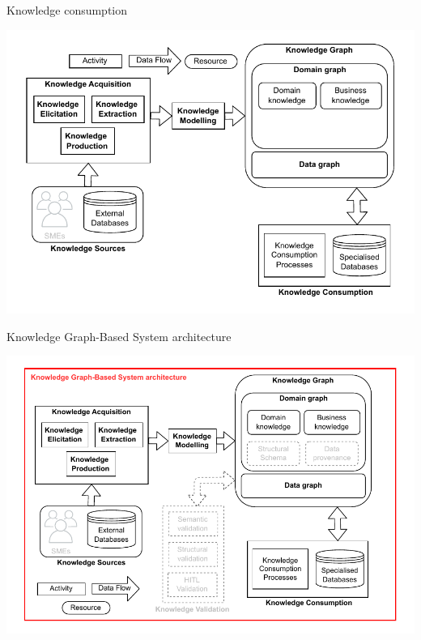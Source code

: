 \begin{frame}{Knowledge consumption}

        \begin{center}
            \includegraphics[scale=0.7]{images/KGBS-knowledge-consumption-legende.pdf} 
        \end{center}

\end{frame}

\begin{frame}{Knowledge Graph-Based System architecture}

        \begin{center}
            \includegraphics[scale=0.6]{images/KGBS-architecture-legende.pdf} 
        \end{center}

\end{frame}

